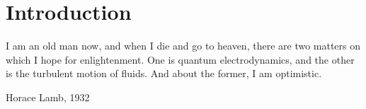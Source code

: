 		\setcounter{secnumdepth}{0}
\chapter*{Introduction}

\epigraph{ I am an old man now, and when I die and go to heaven, there are two matters on which I hope for enlightenment. One is quantum electrodynamics, and the other is the turbulent motion of fluids. And about the former, I am optimistic. }{Horace Lamb, 1932}
	
